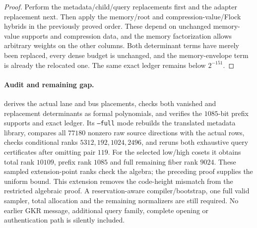 \begin{proof}
Perform the metadata/child/query replacements first and the adapter replacement next. Then apply the memory/root and compression-value/Flock hybrids in the previously proved order. These depend on unchanged memory-value supports and compression data, and the memory factorization allows arbitrary weights on the other columns. Both determinant terms have merely been replaced, every dense budget is unchanged, and the memory-envelope term is already the relocated one. The same exact ledger remains below $2^{-151}$.
\end{proof}

\paragraph{Audit and remaining gap.}  derives the actual lane and bus placements, checks both vanished and replacement determinants as formal polynomials, and verifies the $1085$-bit prefix supports and exact ledger. Its \texttt{--full} mode rebuilds the translated metadata library, compares all $77180$ nonzero raw source directions with the actual rows, checks conditional ranks $5312,192,1024,2496$, and reruns both exhaustive query certificates after omitting pair $119$. For the selected low/high cosets it obtains total rank $10109$, prefix rank $1085$ and full remaining fiber rank $9024$. These sampled extension-point ranks check the algebra; the preceding proof supplies the uniform bound. This extension removes the code-height mismatch from the restricted algebraic proof. A reservation-aware compiler/bootstrap, one full valid sampler, total allocation and the remaining normalizers are still required. No earlier GKR message, additional query family, complete opening or authentication path is silently included.
